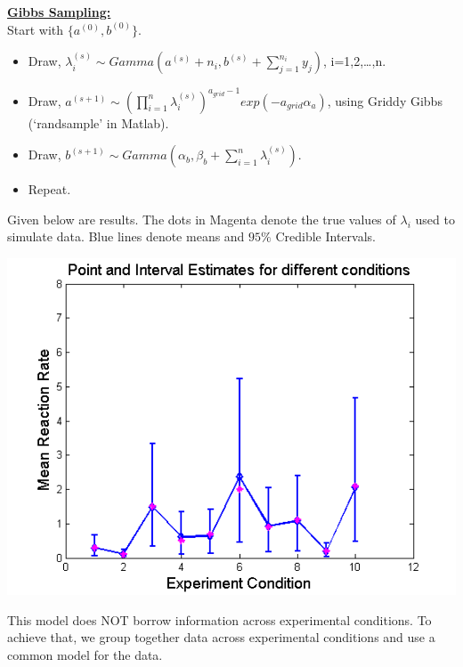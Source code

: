 \documentclass{article}
\begin{document}
\pagebreak

\noindent \underline{\textbf{Gibbs Sampling:}}\\
Start with $\{a^{(0)},b^{(0)}\}$.
\begin{itemize}
\item Draw, $\lambda_i^{(s)} \sim Gamma\left(a^{(s)}+n_i,b^{(s)}+\sum_{j=1}^{n_i}{y_j}\right)$, i=1,2,\ldots,n.
\item Draw, $a^{(s+1)} \sim \left(\prod_{i=1}^{n}{\lambda_i^{(s)}}\right)^{a_{grid}-1}exp(-a_{grid}\alpha_a)$, using Griddy Gibbs (`randsample' in Matlab).
\item Draw, $b^{(s+1)} \sim Gamma\left(\alpha_b,\beta_b+\sum_{i=1}^{n}{\lambda_i^{(s)}}\right)$.
\item Repeat.
\end{itemize}

Given below are results. The dots in Magenta denote the true values of $\lambda_i$ used to simulate data. Blue lines denote means and $95\%$ Credible Intervals.\\

\begin{center}
\includegraphics[scale=0.75]{HierarchicalModel.png}\\
\end{center}

\pagebreak

 This model does NOT borrow information across experimental conditions. To achieve that, we group together data across experimental conditions and use a common model for the data. \\
\end{document}
